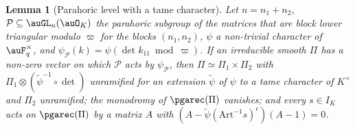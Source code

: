 \documentclass[10pt]{amsart}
\newtheorem{lemma}[theorem]{Lemma}
\theoremstyle{definition}
\theoremstyle{remark}
\begin{document}
\begin{lemma}[Parahoric level with a tame character]\label{pga:parahoric}
Let $n=n_1+n_2$, $\mathcal P\subseteq\auGL_n(\auO_K)$ the parahoric subgroup of the matrices that
are block lower triangular modulo $\varpi$ for the blocks $(n_1,n_2)$, $\psi$ a non-trivial
character of $\auF_q^\times$, and $\psi_{\mathcal P}(k)=\psi(\det k_{11}\bmod\varpi)$. If an
irreducible smooth $\Pi$ has a non-zero vector on which $\mathcal P$ acts by $\psi_{\mathcal P}$,
then $\Pi\simeq\Pi_1\times\Pi_2$ with $\Pi_1\otimes(\tilde\psi^{-1}\circ\det)$ unramified for an
extension $\tilde\psi$ of $\psi$ to a tame character of $K^\times$ and $\Pi_2$ unramified; the
monodromy of $\pgarec(\Pi)$ vanishes; and every $s\in I_K$ acts on $\pgarec(\Pi)$ by a matrix
$A$ with $(A-\tilde\psi(\mathrm{Art}^{-1}s)^{\epsilon})(A-1)=0$.
\end{lemma}
\end{document}
